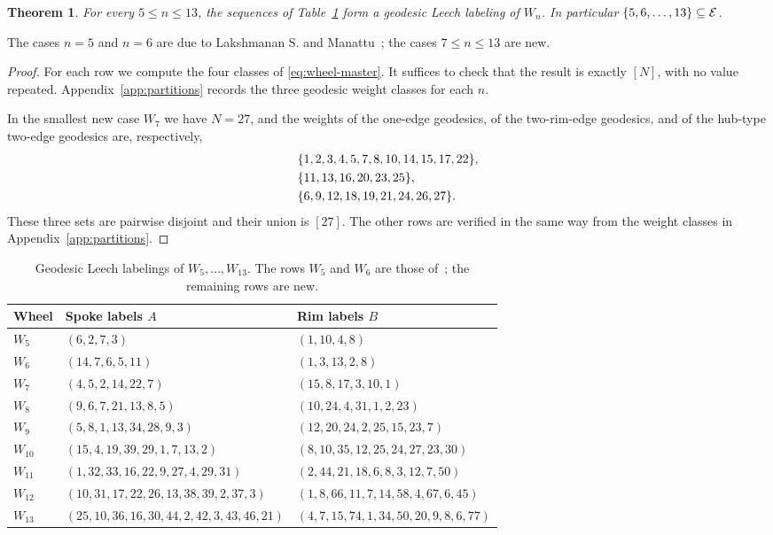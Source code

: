 \documentclass[11pt]{article}
\newtheorem{theorem}{Theorem}[section]
\theoremstyle{definition}
\theoremstyle{remark}
\numberwithin{equation}{section}
\newcommand{\calE}{\mathcal{E}}
\DeclarePairedDelimiter{\set}{\{}{\}}
\begin{document}
\begin{theorem}\label{thm:explicit}
For every $5\le n\le13$, the sequences of Table~\ref{tab:certificates} form a geodesic Leech labeling of $W_n$. In particular $\set{5,6,\ldots,13}\subseteq\calE$.
\end{theorem}

\noindent
The cases $n=5$ and $n=6$ are due to Lakshmanan S. and
Manattu~\cite{LakshmananManattu2025}; the cases $7\le n\le13$ are new.

\begin{proof}
For each row we compute the four classes of \eqref{eq:wheel-master}. It suffices to check that the result is exactly $[N]$, with no value repeated. Appendix~\ref{app:partitions} records the three geodesic weight classes for each $n$.

In the smallest new case $W_7$ we have $N=27$, and the weights of the one-edge geodesics, of the two-rim-edge geodesics, and of the hub-type two-edge geodesics are, respectively,
\begin{align*}
&\set{1,2,3,4,5,7,8,10,14,15,17,22},\\
&\set{11,13,16,20,23,25},\\
&\set{6,9,12,18,19,21,24,26,27}.
\end{align*}
These three sets are pairwise disjoint and their union is $[27]$. The other rows are verified in the same way from the weight classes in Appendix~\ref{app:partitions}.
\end{proof}

\begin{table}[ht]
\centering
\caption{Geodesic Leech labelings of $W_5,\ldots,W_{13}$. The rows $W_5$ and
$W_6$ are those of~\cite[Figure~3]{LakshmananManattu2025}; the remaining rows are
new.}\label{tab:certificates}
\begin{tabular}{@{}lll@{}}
\toprule
Wheel & Spoke labels $A$ & Rim labels $B$\\
\midrule
$W_5$ & $(6,2,7,3)$ & $(1,10,4,8)$\\
$W_6$ & $(14,7,6,5,11)$ & $(1,3,13,2,8)$\\
$W_7$ & $(4,5,2,14,22,7)$ & $(15,8,17,3,10,1)$\\
$W_8$ & $(9,6,7,21,13,8,5)$ & $(10,24,4,31,1,2,23)$\\
$W_9$ & $(5,8,1,13,34,28,9,3)$ & $(12,20,24,2,25,15,23,7)$\\
$W_{10}$ & $(15,4,19,39,29,1,7,13,2)$ & $(8,10,35,12,25,24,27,23,30)$\\
$W_{11}$ & $(1,32,33,16,22,9,27,4,29,31)$ & $(2,44,21,18,6,8,3,12,7,50)$\\
$W_{12}$ & $(10,31,17,22,26,13,38,39,2,37,3)$ & $(1,8,66,11,7,14,58,4,67,6,45)$\\
$W_{13}$ & $(25,10,36,16,30,44,2,42,3,43,46,21)$ & $(4,7,15,74,1,34,50,20,9,8,6,77)$\\
\bottomrule
\end{tabular}
\end{table}
\end{document}
